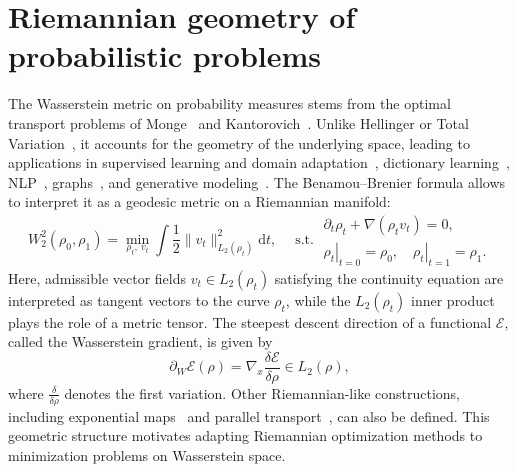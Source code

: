 \documentclass{article} %
\numberwithin{equation}{subsection}
\numberwithin{theorem}{section}
\newcommand{\dd}{\mathrm{d}}
\newcommand{\cE}{\mathcal{E}}
\begin{document}
\section{Riemannian geometry of probabilistic problems}\label{sec:pullback_geometry}
The Wasserstein metric on probability measures stems from the optimal transport problems of Monge~\cite{monge1781memoire} and Kantorovich~\cite{kantorovich1942translocation}. 
Unlike  Hellinger or Total Variation~\cite{gibbs2002choosing}, it accounts for the geometry of the underlying space, leading to applications in supervised learning and domain adaptation~\cite{courty2016optimal}, dictionary learning~\cite{schmitz2018wasserstein}, NLP~\cite{xu2018distilled}, graphs~\cite{vayer2018optimal}, and generative modeling~\cite{arjovsky2017wasserstein}. 
The Benamou--Brenier formula allows to interpret it as a geodesic metric on a Riemannian manifold:
\begin{equation*}\label{eq:benamou-brenier}
    W^2_2(\rho_0, \rho_1)
    =
    \min_{\rho_t,\ v_t}
    \int \frac{1}{2}\|v_t\|^2_{L_2(\rho_t)}\dd{t},
    \quad 
    \operatorname{s.t. }
    \begin{gathered}
        \partial_t \rho_t + \nabla(\rho_t v_t) = 0,\\
        \left. \rho_t\right|_{t=0} = \rho_0,\quad
        \left. \rho_t\right|_{t=1} = \rho_1 .
    \end{gathered}
\end{equation*}
Here, admissible vector fields \(v_t\in L_2(\rho_t)\) satisfying the continuity equation are interpreted as tangent vectors to the curve \(\rho_t\), while the \(L_2(\rho_t)\) inner product plays the role of a metric tensor. 
The steepest descent direction of a functional $\cE$, called the Wasserstein gradient, is given by
\begin{equation*}
    \partial_W \cE(\rho)
    =
    \nabla_x \frac{\delta \cE}{\delta \rho}
    \in L_2(\rho),
\end{equation*}
where \(\frac{\delta}{\delta \rho}\) denotes the first variation. 
Other Riemannian-like constructions, including exponential maps~\cite{gigli2008geometry} and parallel transport~\cite{ambrosio2008construction}, can also be defined. This geometric structure motivates adapting Riemannian optimization methods to minimization problems on Wasserstein space. 
\end{document}

